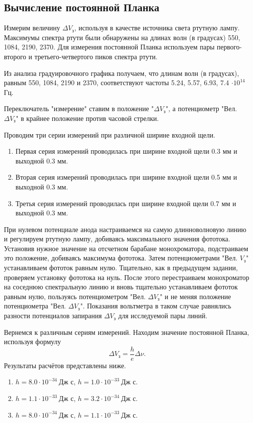 \documentclass[12pt]{article}
\begin{document}
	 \subsection{Вычисление постоянной Планка}
	 Измерим величину $\Delta V_\text{з}$, используя в качестве источника света ртутную лампу. Максимумы спектра ртути были обнаружены на длинах волн (в градусах) 550, 1084, 2190, 2370. Для измерения постоянной Планка используем пары первого-второго и третьего-четвертого пиков спектра ртути.
	 \par Из анализа градуировочного графика получаем, что длинам волн (в градусах), равным 550, 1084, 2190 и 2370, соответствуют частоты 5.24, 5.57, 6.93, 7.4 $\cdot10^{14}$ Гц.
	 \par  Переключатель "{}измерение"{} ставим в положение "{}$\Delta V_\text{з}$"{}, а потенциометр "{}Вел. $\Delta V_\text{з}$"{} в крайнее положение против часовой стрелки. 
	 \par Проводим три серии измерений при различной ширине входной щели.
	 \begin{enumerate}
	 	\item Первая серия измерений проводилась при ширине входной щели 0.3 мм и выходной 0.3 мм.
	 	\item Вторая серия измерений проводилась при ширине входной щели 0.5 мм и выходной 0.3 мм.
	 	\item Третья серия измерений проводилась при ширине входной щели 0.7 мм и выходной 0.3 мм.
	 \end{enumerate}
	 При нулевом потенциале анода настраиваемся на самую длинноволновую линию и регулируем ртутную лампу, добиваясь максимального значения фототока. Установив нужное значение на отсчетном барабане монохроматора, подстраиваем это положение, добиваясь максимума фототока. Затем потенциометрами "{}Вел. $V_\text{з}$"{} устанавливаем фототок равным нулю. Тщательно, как в предыдущем задании, проверяем установку фототока на нуль. После этого перестраиваем монохроматор на соседнюю спектральную линию и вновь тщательно устанавливаем фототок равным нулю, пользуясь потенциометром "{}Вел. $\Delta V_\text{з}$"{} и не меняя положение потенциометра "{}Вел. $\Delta V_\text{з}$"{}. Показания вольтметра в таком случае равнялись разности потенциалов запирания $\Delta V_\text{з}$ для исследуемой пары линий. 
	 \par Вернемся к различным сериям измерений. Находим значение постоянной Планка, используя формулу 
	 \begin{equation}
	  	\Delta V_\text{з} = \dfrac{h}{e} \Delta \nu.
	  \end{equation}
	  Результаты расчётов представлены ниже.
	  \begin{enumerate}
	 	\item $h = 8.0 \cdot 10^{-34}\ \text{Дж с}$, $h = 1.0 \cdot 10^{-33}\ \text{Дж с}$.
	 	\item $h = 1.1 \cdot 10^{-33}\ \text{Дж с}$, $h = 3.2 \cdot 10^{-34}\ \text{Дж с}$.
	 	\item $h = 8.0 \cdot 10^{-34}\ \text{Дж с}$, $h = 1.1 \cdot 10^{-33}\ \text{Дж с}$.
	 \end{enumerate}
\end{document}
